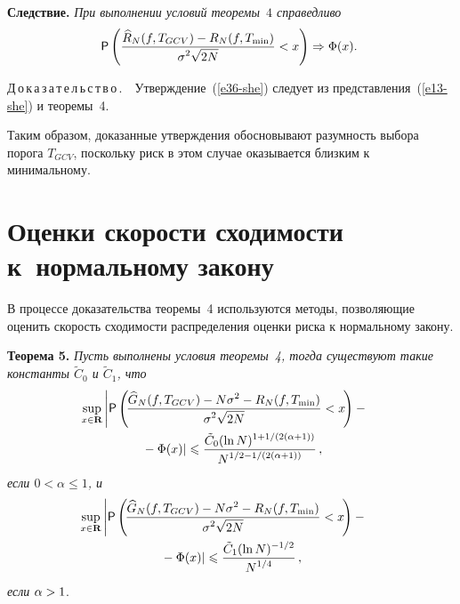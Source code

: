 \begin{multicols}{2}
\smallskip

\noindent
\textbf{Следствие.} \textit{При выполнении условий теоремы~$4$ справедливо}
\begin{equation}
\!\!\!{\sf P}\left(\displaystyle\frac{\displaystyle \widehat{R}_N(f,T_{GCV})-R_N(f,T_{\min})\mathstrut}{\displaystyle \sigma^2\sqrt{2N}\mathstrut}<x\right)\Rightarrow\Phi(x).\!\label{e36-she}
\end{equation}

\smallskip

\noindent
Д\,о\,к\,а\,з\,а\,т\,е\,л\,ь\,с\,т\,в\,о\,.\ \ Утверждение~(\ref{e36-she}) следует из представления~(\ref{e13-she}) и теоремы~4.

\smallskip
Таким образом, доказанные утверждения обосно\-вы\-ва\-ют 
разумность выбора порога $T_{GCV}$, поскольку риск в этом случае оказывается 
близким к минимальному.

\section{Оценки скорости сходимости к~нормальному закону}

В процессе доказательства теоремы~4 используются методы, позволяющие оценить скорость сходимости 
распределения оценки риска к нормальному закону.

\smallskip

\noindent
\textbf{Теорема 5.} \textit{Пусть выполнены условия теоремы~4, тогда существуют такие константы $\tilde{C}_0$ и $\tilde{C}_1$, что}
\begin{multline}
\hspace*{-3.8mm}\sup\limits_{x\in\mathbf{R}}\left\vert {\sf P}\left(\!\fr{\widehat{G}_N(f,T_{GCV})-N\sigma^2-R_N(f,T_{\min})}
{\sigma^2\sqrt{2N}}<x\!\right)-{}\right.\hspace*{-1.7pt}\\
\left.{}-\Phi(x)\right\vert\leqslant \fr{\tilde{C}_0(\ln N)^{1+{1}/({2(\alpha+1)})}}{N^{{1}/{2}-{1}/({2(\alpha+1)})}}\,,\label{e37-she}
\end{multline}
\textit{если $0<\alpha\leqslant1$, и}
\begin{multline}
\hspace*{-3.8mm}\sup\limits_{x\in\mathbf{R}}\left\vert{\sf P}\left(\!\fr{\widehat{G}_N(f,T_{GCV})-N\sigma^2-R_N(f,T_{\min})}
{\sigma^2\sqrt{2N}}<x\!\right)-{}\right.\hspace*{-1.6102pt}\\
\left.{}-\Phi(x)\right\vert
\leqslant\fr{\tilde{C}_1(\ln N)^{-{1}/{2}}}{N^{{1}/{4}}}\,,\label{e38-she}
\end{multline}
\textit{если} $\alpha\hm>1$.


\end{multicols}

